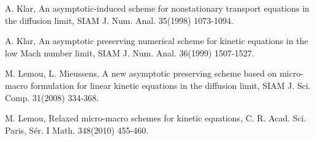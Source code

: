 \documentclass[12pt, a4paper]{article}
\begin{document}
\begin{thebibliography}{999}
 A. Klar, An asymptotic-induced scheme for nonstationary transport equations in the diffusion limit, SIAM J. Num. Anal. 35(1998) 1073-1094.


 A. Klar, An asymptotic preserving numerical scheme for kinetic equations in the low Mach number limit, SIAM J. Num. Anal. 36(1999) 1507-1527.


 M. Lemou, L. Mieussens, A new asymptotic preserving scheme based on micro-macro formulation for linear kinetic equations in the diffusion limit, SIAM J. Sci. Comp. 31(2008) 334-368.


 M. Lemou, Relaxed micro-macro schemes for kinetic equations, C. R. Acad. Sci. Paris, S\'er. I Math. 348(2010) 455-460.



\end{thebibliography}
\end{document}
